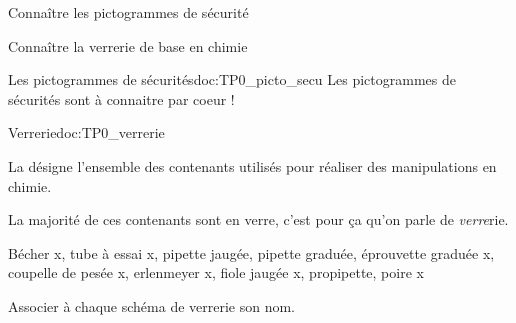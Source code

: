 \teteSndCorp

\vspace*{-36pt}


\begin{objectifs}
  \item Connaître les pictogrammes de sécurité
  \item Connaître la verrerie de base en chimie
\end{objectifs}


\begin{doc}{Les pictogrammes de sécurités}{doc:TP0_picto_secu}
  Les pictogrammes de sécurités sont à connaitre par coeur !
  \begin{encart}
  \end{encart}
\end{doc}

\begin{doc}{Verrerie}{doc:TP0_verrerie}
  \begin{encart}
    La  désigne l'ensemble des contenants utilisés pour réaliser des manipulations en chimie.
  \end{encart}
  La majorité de ces contenants sont en verre, c'est pour ça qu'on parle de \textit{verre}rie.
  
  Bécher x,
  tube à essai x,
  pipette jaugée,
  pipette graduée,
  éprouvette graduée x,
  coupelle de pesée x,
  erlenmeyer x,
  fiole jaugée x,
  propipette,
  poire x
\end{doc}


\numeroQuestion Associer à chaque schéma de verrerie son nom.